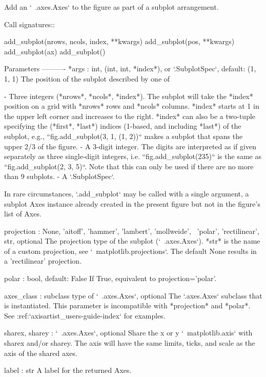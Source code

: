 \begin{DoxyVerb}Add an `~.axes.Axes` to the figure as part of a subplot arrangement.

Call signatures::

   add_subplot(nrows, ncols, index, **kwargs)
   add_subplot(pos, **kwargs)
   add_subplot(ax)
   add_subplot()

Parameters
----------
*args : int, (int, int, *index*), or `.SubplotSpec`, default: (1, 1, 1)
    The position of the subplot described by one of

    - Three integers (*nrows*, *ncols*, *index*). The subplot will
      take the *index* position on a grid with *nrows* rows and
      *ncols* columns. *index* starts at 1 in the upper left corner
      and increases to the right.  *index* can also be a two-tuple
      specifying the (*first*, *last*) indices (1-based, and including
      *last*) of the subplot, e.g., ``fig.add_subplot(3, 1, (1, 2))``
      makes a subplot that spans the upper 2/3 of the figure.
    - A 3-digit integer. The digits are interpreted as if given
      separately as three single-digit integers, i.e.
      ``fig.add_subplot(235)`` is the same as
      ``fig.add_subplot(2, 3, 5)``. Note that this can only be used
      if there are no more than 9 subplots.
    - A `.SubplotSpec`.

    In rare circumstances, `.add_subplot` may be called with a single
    argument, a subplot Axes instance already created in the
    present figure but not in the figure's list of Axes.

projection : {None, 'aitoff', 'hammer', 'lambert', 'mollweide', \
'polar', 'rectilinear', str}, optional
    The projection type of the subplot (`~.axes.Axes`). *str* is the
    name of a custom projection, see `~matplotlib.projections`. The
    default None results in a 'rectilinear' projection.

polar : bool, default: False
    If True, equivalent to projection='polar'.

axes_class : subclass type of `~.axes.Axes`, optional
    The `.axes.Axes` subclass that is instantiated.  This parameter
    is incompatible with *projection* and *polar*.  See
    :ref:`axisartist_users-guide-index` for examples.

sharex, sharey : `~.axes.Axes`, optional
    Share the x or y `~matplotlib.axis` with sharex and/or sharey.
    The axis will have the same limits, ticks, and scale as the axis
    of the shared axes.

label : str
    A label for the returned Axes.


\end{DoxyVerb}
